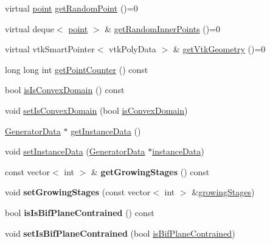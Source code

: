 \begin{DoxyCompactItemize}
\item 
virtual \hyperlink{structpoint}{point} \hyperlink{class_abstract_domain_ae31a5b26d1dc628abe24da7a4d375415}{get\+Random\+Point} ()=0
\item 
virtual deque$<$ \hyperlink{structpoint}{point} $>$ \& \hyperlink{class_abstract_domain_a73d2c0e7c670b007bb5dbbdab5ad6b1b}{get\+Random\+Inner\+Points} ()=0
\item 
virtual vtk\+Smart\+Pointer$<$ vtk\+Poly\+Data $>$ \& \hyperlink{class_abstract_domain_abb1e386d2899cb6b725509259a836cd0}{get\+Vtk\+Geometry} ()=0
\item 
long long int \hyperlink{class_abstract_domain_a7d75c8de368f4d97c884b7003cac067c}{get\+Point\+Counter} () const 
\item 
bool \hyperlink{class_abstract_domain_a57291efb709950e97ffd7beb754cd271}{is\+Is\+Convex\+Domain} () const 
\item 
void \hyperlink{class_abstract_domain_a58af16f2954ae8c978c604bf18b99880}{set\+Is\+Convex\+Domain} (bool \hyperlink{class_abstract_domain_acaa76f4d7e102e66b64d10cd652167c9}{is\+Convex\+Domain})
\item 
\hyperlink{class_generator_data}{Generator\+Data} $\ast$ \hyperlink{class_abstract_domain_ad21236a7e37d5dc7763dd0a90d0233ce}{get\+Instance\+Data} ()
\item 
void \hyperlink{class_abstract_domain_a6607101a2ed91199d0675c3d33a029f7}{set\+Instance\+Data} (\hyperlink{class_generator_data}{Generator\+Data} $\ast$\hyperlink{class_abstract_domain_aa37fbabc2bfa92c574f7db7544016b53}{instance\+Data})
\item 
const vector$<$ int $>$ \& {\bfseries get\+Growing\+Stages} () const \hypertarget{class_abstract_domain_af6c54165b4fbb54f22cffac3e6d8376c}{}\label{class_abstract_domain_af6c54165b4fbb54f22cffac3e6d8376c}

\item 
void {\bfseries set\+Growing\+Stages} (const vector$<$ int $>$ \&\hyperlink{class_abstract_domain_a765dfd145f6559fc26cc0a36f1bf034a}{growing\+Stages})\hypertarget{class_abstract_domain_ac2687216bb6c1cbceacb02b5b3265df8}{}\label{class_abstract_domain_ac2687216bb6c1cbceacb02b5b3265df8}

\item 
bool {\bfseries is\+Is\+Bif\+Plane\+Contrained} () const \hypertarget{class_abstract_domain_ac5fd6317f3e6a57a7083d9117a6ebf65}{}\label{class_abstract_domain_ac5fd6317f3e6a57a7083d9117a6ebf65}

\item 
void {\bfseries set\+Is\+Bif\+Plane\+Contrained} (bool \hyperlink{class_abstract_domain_a1b9397f6ac56e1a973d812498153be95}{is\+Bif\+Plane\+Contrained})\hypertarget{class_abstract_domain_ae75192c5000f51e1c6ce53078dd17e03}{}\label{class_abstract_domain_ae75192c5000f51e1c6ce53078dd17e03}


\end{DoxyCompactItemize}
